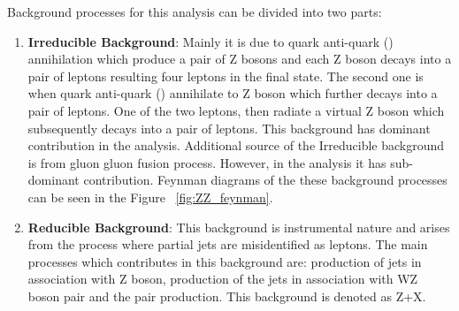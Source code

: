 Background processes for this analysis can be divided into two parts:
\begin{enumerate}
	\item \textbf{Irreducible Background}: Mainly it is due to quark anti-quark (\qqbar) annihilation which produce a pair of Z bosons and each Z boson decays into a pair of leptons resulting four leptons in the final state. The second one is when quark anti-quark (\qqbar) annihilate to Z boson which further decays into a pair of leptons. One of the two leptons, then radiate a virtual Z boson which subsequently decays into a pair of leptons. This background has dominant contribution in the analysis. Additional source of the Irreducible background is from gluon gluon fusion process. However, in the analysis it has sub-dominant contribution. Feynman diagrams of the these background processes can be seen in the Figure ~\ref{fig:ZZ_feynman}.
	\item \textbf{Reducible Background}: This background is instrumental nature and arises from the process where partial jets are misidentified as leptons. The main processes which contributes in this
background are: production of jets in association with Z boson, production of the jets in association with WZ boson pair and the \TTbar pair production. This background is denoted as Z+X.
\end{enumerate}
